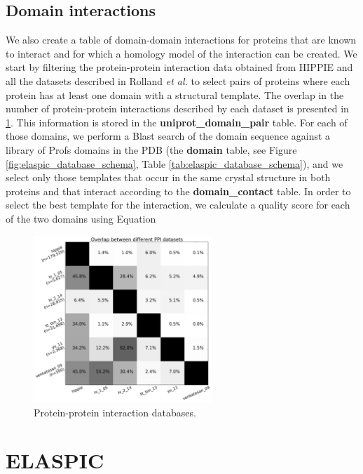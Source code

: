 \subsection{Domain interactions}

We also create a table of domain-domain interactions for proteins that are known to interact and for which a homology model of the interaction can be created. We start by filtering the protein-protein interaction data obtained from HIPPIE \cite{schaefer_hippie:_2012} and all the datasets described in Rolland \textit{et al.} \cite{rolland_proteome-scale_2014} to select pairs of proteins where each protein has at least one domain with a structural template. The overlap in the number of protein-protein interactions described by each dataset is presented in \ref{fig:ppi_database_overlap}. This information is stored in the \textbf{uniprot\_domain\_pair} table. For each of those domains, we perform a Blast search of the domain sequence against a library of Profs domains in the PDB (the \textbf{domain} table, see Figure \ref{fig:elaspic_database_schema}, Table \ref{tab:elaspic_database_schema}), and we select only those templates that occur in the same crystal structure in both proteins and that interact according to the \textbf{domain\_contact} table. In order to select the best template for the interaction, we calculate a quality score for each of the two domains using Equation


\begin{figure}[ht]
	\centering
	\includegraphics[width=0.6\textwidth]{static/profs/ppi_database_overlap.png}
	\caption[Protein-protein interaction databases.]{Protein-protein interaction databases.}
	\label{fig:ppi_database_overlap}
\end{figure}




\section{ELASPIC}

